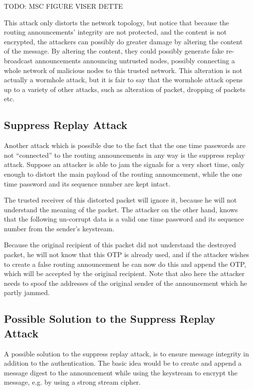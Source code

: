 TODO: MSC FIGURE VISER DETTE

This attack only distorts the network topology, but notice that because the
routing announcements' integrity are not protected, and the content is not
encrypted, the attackers can possibly do greater damage by altering the content
of the message. By altering the content, they could possibly generate fake
re-broadcast announcements announcing untrusted nodes, possibly connecting a
whole network of malicious nodes to this trusted network. This alteration is
not actually a wormhole attack, but it is fair to say that the wormhole attack
opens up to a variety of other attacks, such as alteration of packet, dropping
of packets etc.

\subsection{Suppress Replay Attack}
Another attack which is possible due to the fact that the one time passwords are
not ``connected'' to the routing announcements in any way is the suppress replay
attack. Suppose an attacker is able to jam the signals for a very short time,
only enough to distort the main payload of the routing announcement, while the
one time password and its sequence number are kept intact.

The trusted receiver of this distorted packet will ignore it, because he will
not understand the meaning of the packet. The attacker on the other hand, knows
that the following un-corrupt data is a valid one time password and its sequence
number from the sender's keystream.

Because the original recipient of this packet did not understand the destroyed
packet, he will not know that this \ac{OTP} is already used, and if the attacker
wishes to create a false routing announcement he can now do this and append the
\ac{OTP}, which will be accepted by the original recipient. Note that also here
the attacker needs to spoof the addresses of the original sender of the
announcement which he partly jammed.

\subsection{Possible Solution to the Suppress Replay Attack}
A possible solution to the suppress replay attack, is to ensure message
integrity in addition to the authentication. The basic idea would be to create
and append a message digest to the announcement while using the keystream to
encrypt the message, e.g. by using a strong stream cipher.


